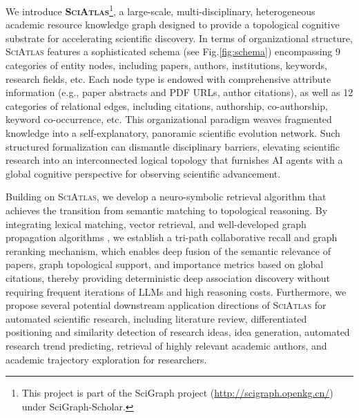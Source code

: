 \documentclass{llmxive}
\providecommand{\ours}{\textsc{SciAtlas}}
\begin{document}
We introduce \textbf{\ours}\footnote{This project is part of the SciGraph project (\url{http://scigraph.openkg.cn/}) under SciGraph-Scholar.}, a large-scale, multi-disciplinary, heterogeneous academic resource knowledge graph designed to provide a topological cognitive substrate for accelerating scientific discovery.
In terms of organizational structure, {\ours} features a sophisticated schema (see Fig.\ref{fig:schema}) encompassing 9 categories of entity nodes, including papers, authors, institutions, keywords, research fields, etc.
Each node type is endowed with comprehensive attribute information (e.g., paper abstracts and PDF URLs, author citations), as well as 12 categories of relational edges, including citations, authorship, co-authorship, keyword co-occurrence, etc.
This organizational paradigm weaves fragmented knowledge into a self-explanatory, panoramic scientific evolution network.
Such structured formalization can dismantle disciplinary barriers, elevating scientific research into an interconnected logical topology that furnishes AI agents with a global cognitive perspective for observing scientific advancement.

Building on {\ours}, we develop a neuro-symbolic retrieval algorithm that achieves the transition from semantic matching to topological reasoning.
By integrating lexical matching, vector retrieval, and well-developed graph propagation algorithms \citep{rwr}, we establish a tri-path collaborative recall and graph reranking mechanism, which enables deep fusion of the semantic relevance of papers, graph topological support, and importance metrics based on global citations, thereby providing deterministic deep association discovery without requiring frequent iterations of LLMs and high reasoning costs.
Furthermore, we propose several potential downstream application directions of {\ours} for automated scientific research, including literature review, differentiated positioning and similarity detection of research ideas, idea generation, automated research trend predicting, retrieval of highly relevant academic authors, and academic trajectory exploration for researchers.
\end{document}
